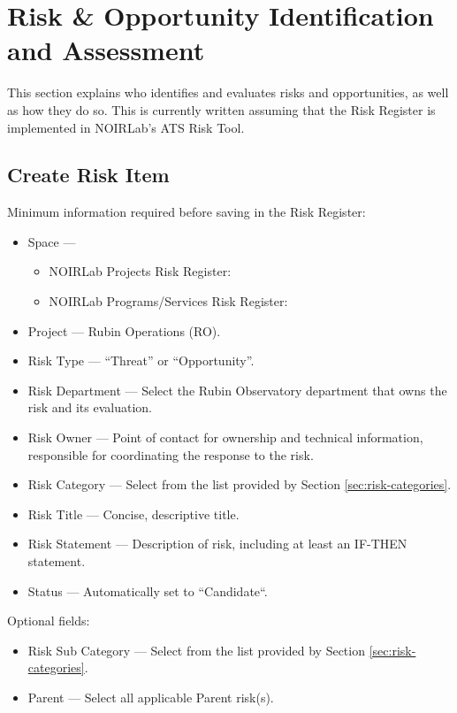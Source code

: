 \section{Risk \& Opportunity Identification and Assessment}
\label{sec:id-assess}

This section explains who identifies and evaluates risks and opportunities, as well as how they do so.
This is currently written assuming that the Risk Register is implemented in NOIRLab's ATS Risk Tool.

\subsection{Create Risk Item}

Minimum information required before saving in the Risk Register:
\begin{itemize}
	\item Space --- 
        \begin{itemize}
            \item NOIRLab Projects Risk Register: 
            \item NOIRLab Programs/Services Risk Register:
        \end{itemize}
    \item Project --- Rubin Operations (RO).
	\item Risk Type --- ``Threat'' or ``Opportunity''.
	\item Risk Department --- Select the Rubin Observatory department that owns the risk and its evaluation.
	\item Risk Owner --- Point of contact for ownership and technical information, responsible for coordinating the response to the risk.
	\item Risk Category --- Select from the list provided by Section \ref{sec:risk-categories}.
	\item Risk Title --- Concise, descriptive title.
	\item Risk Statement --- Description of risk, including at least an IF-THEN statement.
	\item Status --- Automatically set to ``Candidate``.
\end{itemize}

Optional fields:
\begin{itemize}
	\item Risk Sub Category --- Select from the list provided by Section \ref{sec:risk-categories}.
	\item Parent --- Select all applicable Parent risk(s).
\end{itemize}

